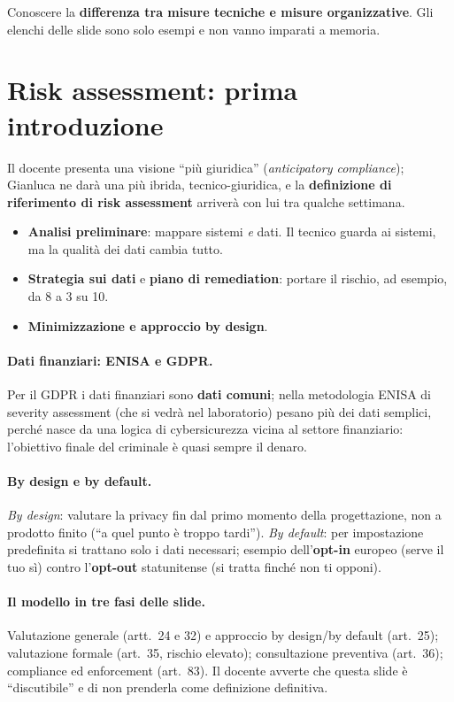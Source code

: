\begin{esame}
Conoscere la \textbf{differenza tra misure tecniche e misure organizzative}. Gli elenchi delle slide
sono solo esempi e non vanno imparati a memoria.
\end{esame}

\section{Risk assessment: prima introduzione}
Il docente presenta una visione ``più giuridica'' (\emph{anticipatory compliance}); Gianluca ne darà
una più ibrida, tecnico-giuridica, e la \textbf{definizione di riferimento di risk assessment} arriverà
con lui tra qualche settimana.
\begin{itemize}
  \item \textbf{Analisi preliminare}: mappare sistemi \emph{e} dati. Il tecnico guarda ai sistemi, ma
    la qualità dei dati cambia tutto.
  \item \textbf{Strategia sui dati} e \textbf{piano di remediation}: portare il rischio, ad esempio,
    da 8 a 3 su 10.
  \item \textbf{Minimizzazione e approccio by design}.
\end{itemize}

\paragraph{Dati finanziari: ENISA e GDPR.} Per il GDPR i dati finanziari sono \textbf{dati comuni};
nella metodologia ENISA di severity assessment (che si vedrà nel laboratorio) pesano più dei dati
semplici, perché nasce da una logica di cybersicurezza vicina al settore finanziario: l'obiettivo
finale del criminale è quasi sempre il denaro.

\paragraph{By design e by default.} \emph{By design}: valutare la privacy fin dal primo momento della
progettazione, non a prodotto finito (``a quel punto è troppo tardi''). \emph{By default}: per
impostazione predefinita si trattano solo i dati necessari; esempio dell'\textbf{opt-in} europeo
(serve il tuo sì) contro l'\textbf{opt-out} statunitense (si tratta finché non ti opponi).

\paragraph{Il modello in tre fasi delle slide.} Valutazione generale (artt.~24 e 32) e approccio by
design/by default (art.~25); valutazione formale (art.~35, rischio elevato); consultazione preventiva
(art.~36); compliance ed enforcement (art.~83). Il docente avverte che questa slide è
``discutibile'' e di non prenderla come definizione definitiva.

